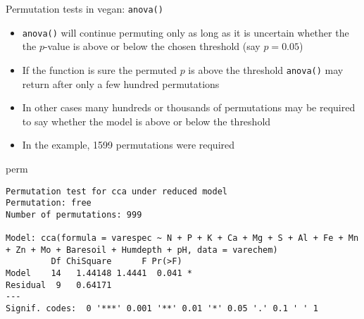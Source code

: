 \documentclass[10pt,ignorenonframetext,compress, aspectratio=169]{beamer}
\newenvironment{Shaded}{\begin{snugshade}}{\end{snugshade}}
\newcommand{\NormalTok}[1]{{#1}}
\begin{document}
\begin{frame}[fragile]{Permutation tests in vegan: \texttt{anova()}}

\begin{itemize}
\itemsep1pt\parskip0pt
\item
  \texttt{anova()} will continue permuting only as long as it is
  uncertain whether the the \(p\)-value is above or below the chosen
  threshold (say \(p = 0.05\))
\item
  If the function is sure the permuted \(p\) is above the threshold
  \texttt{anova()} may return after only a few hundred permutations
\item
  In other cases many hundreds or thousands of permutations may be
  required to say whether the model is above or below the threshold
\item
  In the example, 1599 permutations were required
\end{itemize}

\tiny

\begin{Shaded}
\begin{Highlighting}[]
\NormalTok{perm}
\end{Highlighting}
\end{Shaded}

\begin{verbatim}
Permutation test for cca under reduced model
Permutation: free
Number of permutations: 999

Model: cca(formula = varespec ~ N + P + K + Ca + Mg + S + Al + Fe + Mn + Zn + Mo + Baresoil + Humdepth + pH, data = varechem)
         Df ChiSquare      F Pr(>F)  
Model    14   1.44148 1.4441  0.041 *
Residual  9   0.64171                
---
Signif. codes:  0 '***' 0.001 '**' 0.01 '*' 0.05 '.' 0.1 ' ' 1
\end{verbatim}

\normalsize

\end{frame}
\end{document}
